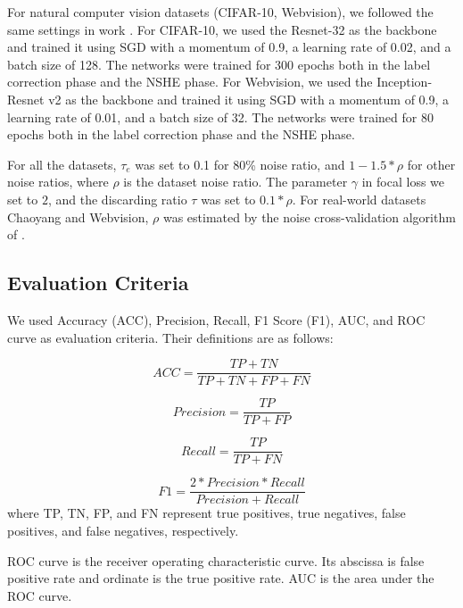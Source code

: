{For natural computer vision datasets (CIFAR-10, Webvision), we followed the same settings in work \cite{chen2019understanding}. For CIFAR-10, we used the Resnet-32 as the backbone and trained it using SGD with a momentum of 0.9, a learning rate of 0.02, and a batch size of 128. The networks were trained for 300 epochs both in the label correction phase and the NSHE phase. For Webvision, we used the Inception-Resnet v2 \cite{2017Inception} as the backbone and trained it using SGD with a momentum of 0.9, a learning rate of 0.01, and a batch size of 32. The networks were trained for 80 epochs both in the label correction phase and the NSHE phase.}

{For all the datasets, $\tau_e$ was set to 0.1 for 80\% noise ratio, and $1-1.5*\rho$ for other noise ratios, where $\rho$ is the dataset noise ratio. The parameter $\gamma$ in focal loss we set to $2$, and the discarding ratio $\tau$ was set to $0.1*\rho$. For real-world datasets Chaoyang and Webvision, $\rho$ was estimated by the noise cross-validation algorithm of \cite{chen2019understanding}.}

\subsection{Evaluation Criteria}

We used Accuracy (ACC), {Precision}, Recall, F1 Score (F1), AUC, and {ROC} curve as evaluation criteria. Their definitions are as follows:

\begin{equation}
ACC=\frac{TP + TN}{TP+TN+FP+FN}
\end{equation}


\begin{equation}
{Precision}=\frac{TP}{TP+FP}
\end{equation}

\begin{equation}
Recall=\frac{TP}{TP+FN}
\end{equation}

\begin{equation}
F1 =\frac{2*{Precision}*Recall}{{Precision}+Recall}
\end{equation}
where TP, TN, FP, and FN represent true positives, true negatives, false positives, and false negatives, respectively.

{ROC} curve is the receiver operating characteristic curve. Its abscissa is false positive rate and ordinate is the true positive rate. AUC is the area under the {ROC} curve. 

